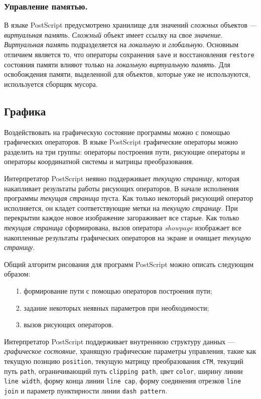 \subsubsection{Управление памятью.}
В языке PostScript предусмотрено хранилище для значений \textit{сложных} объектов --- \textit{виртуальная память}. \textit{Сложный} объект имеет ссылку на свое \textit{значение}. \textit{Виртуальная память} подразделяется на \textit{локальную} и \textit{глобальную}.
Основным отличием является то, что операторы сохранения \texttt{save} и восстановления \texttt{restore} состояния памяти влияют только на \textit{локальную виртуальную память}. 
Для освобождения памяти, выделенной для объектов, которые уже не используются, используется сборщик мусора. 

\subsection{Графика}
Воздействовать на графическую состояние программы можно с помощью графических операторов. В языке PostScript графические операторы можно разделить на три группы: операторы построения пути, рисующие операторы и операторы координатной системы и матрицы преобразования.

Интерпретатор PostScript неявно поддерживает \textit{текущую страницу}, которая накапливает результаты работы рисующих операторов. В начале исполнения программы \textit{текущая страница} пуста. Как только некоторый рисующий оператор исполняется, он кладет соответствующие метки на \textit{текущую страницу}. При перекрытии каждое новое изображение загораживает все старые. Как только \textit{текущая страница} сформирована, вызов оператора \textit{showpage} изображает все накопленные результаты графических операторов на экране и очищает \textit{текущую страницу}.

Общий алгоритм рисования для программ PostScript можно описать следующим образом:

\begin{itemize}
\item [1. ] формирование пути с помощью операторов построения пути;
\item [2. ] задание некоторых неявных параметров при необходимости;
\item [3. ] вызов рисующих операторов.
\end{itemize} 



Интерпретатор PostScript поддерживает внутреннюю структуру данных --- \textit{графическое состояние}, хранящую графические параметры управления, такие как текущую позицию \texttt{position}, текущую матрицу преобразования \texttt{cTM}, текущий путь \texttt{path}, ограничивающий путь \texttt{clipping path}, цвет \texttt{color}, ширину линии \texttt{line width}, форму конца линии \texttt{line cap}, форму соединения отрезков \texttt{line join} и параметр пунктирности линии \texttt{dash pattern}.


